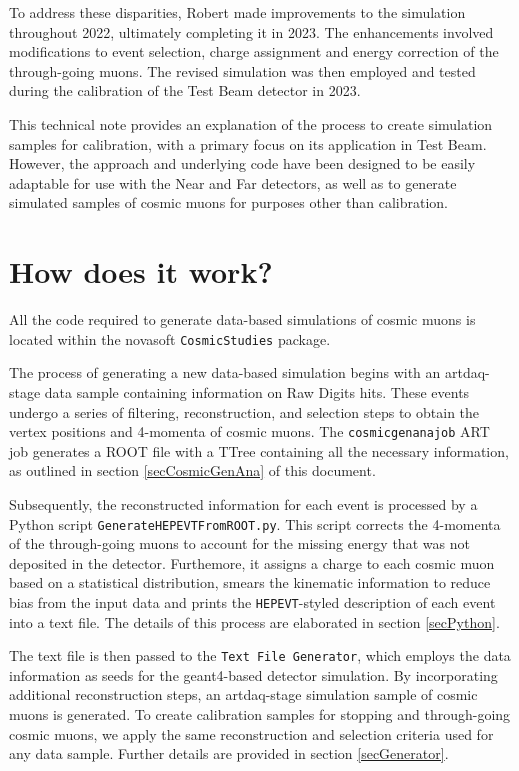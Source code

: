 \documentclass[12pt]{article}
\begin{document}
To address these disparities, Robert made improvements to the simulation throughout 2022, ultimately completing it in 2023. The enhancements involved modifications to event selection, charge assignment and energy correction of the through-going muons. The revised simulation was then employed and tested during the calibration of the Test Beam detector in 2023.

This technical note provides an explanation of the process to create simulation samples for calibration, with a primary focus on its application in Test Beam. However, the approach and underlying code have been designed to be easily adaptable for use with the Near and Far detectors, as well as to generate simulated samples of cosmic muons for purposes other than calibration.

\section{How does it work?}

All the code required to generate data-based simulations of cosmic muons is located within the novasoft \texttt{CosmicStudies} package.

The process of generating a new data-based simulation begins with an artdaq-stage data sample containing information on Raw Digits hits. These events undergo a series of filtering, reconstruction, and selection steps to obtain the vertex positions and 4-momenta of cosmic muons. The \texttt{cosmicgenanajob} ART job generates a ROOT file with a TTree containing all the necessary information, as outlined in section \ref{secCosmicGenAna} of this document.

Subsequently, the reconstructed information for each event is processed by a Python script \texttt{GenerateHEPEVTFromROOT.py}. This script corrects the 4-momenta of the through-going muons to account for the missing energy that was not deposited in the detector. Furthemore, it assigns a charge to each cosmic muon based on a statistical distribution, smears the kinematic information to reduce bias from the input data and prints the \texttt{HEPEVT}-styled description of each event into a text file. The details of this process are elaborated in section \ref{secPython}. 

The text file is then passed to the \texttt{Text File Generator}, which employs the data information as seeds for the geant4-based detector simulation. By incorporating additional reconstruction steps, an artdaq-stage simulation sample of cosmic muons is generated. To create calibration samples for stopping and through-going cosmic muons, we apply the same reconstruction and selection criteria used for any data sample. Further details are provided in section \ref{secGenerator}. 
\end{document}
